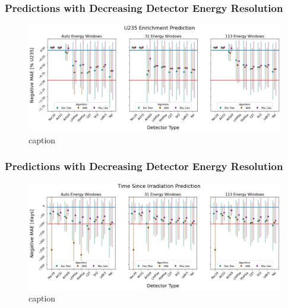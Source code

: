 \begin{frame}
  \frametitle{Predictions with Decreasing Detector Energy Resolution}
  \begin{adjustwidth}{-25pt}{0pt}
  \begin{figure}
    \centering
    \includegraphics[width=1.15\textwidth]{./figures/detector_preds_wrt_enlist_enrichment.png}
    \caption{caption}
  \end{figure}
  \end{adjustwidth}
\end{frame}

\begin{frame}
  \frametitle{Predictions with Decreasing Detector Energy Resolution}
  \begin{adjustwidth}{-25pt}{0pt}
  \begin{figure}
    \centering
    \includegraphics[width=1.15\textwidth]{./figures/detector_preds_wrt_enlist_cooling.png}
    \caption{caption}
  \end{figure}
  \end{adjustwidth}
\end{frame}

